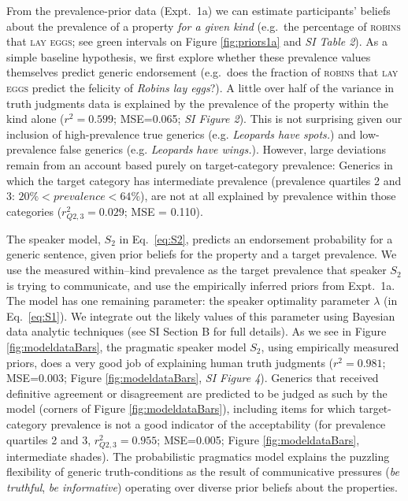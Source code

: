 \documentclass[12pt,letterpaper]{article}
\begin{document}
From the prevalence-prior data (Expt.~1a) we can estimate participants' beliefs about the prevalence of a property \emph{for a given kind} (e.g.~the percentage of \textsc{robins} that \textsc{lay eggs}; see green intervals on Figure \ref{fig:priors1a} and \emph{SI Table 2}).
As a simple baseline hypothesis, we first explore whether these prevalence values themselves predict generic endorsement (e.g.~does the fraction of \textsc{robins} that \textsc{lay eggs} predict the felicity of \emph{Robins lay eggs}?).
A little over half of the variance in truth judgments data is explained by the prevalence of the property within the kind alone ($r^2 = 0.599$; MSE=0.065; \emph{SI Figure 2}). 
This is not surprising given our inclusion of high-prevalence true generics (e.g. \emph{Leopards have spots.}) and low-prevalence false generics (e.g. \emph{Leopards have wings.}). 
However, large deviations remain from an account based purely on target-category prevalence: Generics in which the target category has intermediate prevalence (prevalence quartiles 2 and 3: $ 20\% < prevalence < 64\%$), are not at all explained by prevalence within those categories ($r_{Q2,3}^2 = 0.029$; MSE = 0.110).

The speaker model, $S_2$ in Eq.~\ref{eq:S2}, predicts an endorsement probability for a generic sentence, given prior beliefs for the property and a target prevalence. 
We use the measured within--kind prevalence as the target prevalence that speaker $S_2$ is trying to communicate, and use the
empirically inferred priors from Expt.~1a. The model has one remaining parameter: the speaker optimality parameter $\lambda$ (in Eq.~\ref{eq:S1}).
We integrate out the likely values of this parameter using Bayesian data analytic techniques \cite{LW2014} (see SI Section B for full details).
As we see in Figure \ref{fig:modeldataBars}, the pragmatic speaker model $S_2$, using empirically measured priors, does a very good job of explaining human truth judgments ($r^2=0.981$; MSE=0.003; Figure \ref{fig:modeldataBars}, {\it SI Figure 4}). 
Generics that received definitive agreement or disagreement are predicted to be judged as such by the model (corners of Figure \ref{fig:modeldataBars}), including items for which target-category prevalence is not a good indicator of the acceptability (for prevalence quartiles 2 and 3, $r_{Q2,3}^2=0.955$; MSE=0.005; Figure \ref{fig:modeldataBars}, intermediate shades).
The probabilistic pragmatics model explains the puzzling flexibility of generic truth-conditions as the result of communicative pressures (\emph{be truthful}, \emph{be informative}) operating over diverse prior beliefs about the properties. 
 
\end{document}
